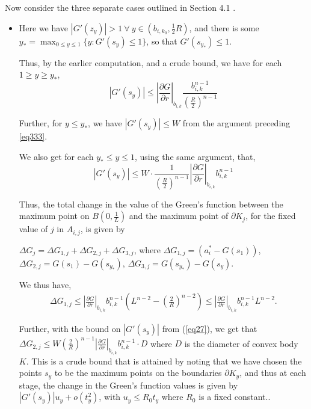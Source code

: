 \documentclass{article}
\theoremstyle{plain}
\theoremstyle{definition}
\theoremstyle{plain}
\begin{document}
Now consider the three separate cases outlined in Section 4.1 .
\begin{itemize}
\item  Here we have $|G'(z_y)| > 1 \ \forall \ y \in (b_{i, k_0}, \frac{1}{2} R)$, and there is some $y_* = \max_{0 \le y \le 1} \{y : G'(s_y) \le 1\}$, so that $G'(s_{y_*}) \le 1$.

Thus, by the earlier computation, and a crude bound, we have for each $1\geq y\geq y_{*}$,
$$|G'(s_y)| \le \left| \frac{\partial G}{\partial r} \right|_{b_{i,k}} \frac{b_{i,k}^{n-1}}{(\frac{R}{2})^{n-1}}$$

Further, for $y \le y_*$, we have $|G'(s_y)| \le W$ from the argument preceding \cref{eq333}.

We also get for each $y_* \le y \le 1$, using the same argument, that,
\begin{equation} \label{eq27}
|G'(s_y)| \le W \cdot \frac{1}{(\frac{R}{2})^{n-1}} \left| \frac{\partial G}{\partial r} \right|_{b_{i,k}} b_{i,k}^{n-1}
\end{equation}



Thus, the total change in the value of the Green's function between the maximum point on $B(0, \frac{1}{L})$ and the maximum point of $\partial K_j$, for the fixed value of $j$ in $A_{i,j}$, is given by

$\Delta G_j = \Delta G_{1,j} + \Delta G_{2,j} + \Delta G_{3,j}$, where 
$\Delta G_{1,j} = (a_i^* - G(s_1))$, $\Delta G_{2,j} = G(s_1) - G(s_{y_*})$, $\Delta G_{3,j} = G(s_{y_*}) - G(s_y)$.

We thus have, \begin{align}\Delta G_{1,j} \le \left| \frac{\partial G}{\partial r} \right|_{b_{i,k}} b_{i,k}^{n-1} \left( L^{n-2} - \left( \frac{2}{R} \right)^{n-2} \right) \le \left| \frac{\partial G}{\partial r} \right|_{b_{i,k}} b_{i,k}^{n-1} L^{n-2}.\end{align}

Further, with the bound on $|G'(s_y)|$ from (\ref{eq27}), we get that $\Delta G_{2,j} \le W \left( \frac{2}{R} \right)^{n-1} \left| \frac{\partial G}{\partial r} \right|_{b_{i,k}} b_{i,k}^{n-1} \cdot D$ where $D$ is the diameter of convex body $K$. This is a crude bound that is attained by noting that we have chosen the points $s_y$ to be the maximum points on the boundaries $\partial K_y$, and thus at each stage, the change in the Green's function values is given by $|G'(s_y)| u_y + o(t_y^2)$, with $u_y \le R_0 t_y$ where $R_0$ is a fixed constant..


\end{itemize}
\end{document}

